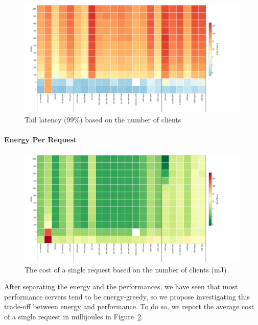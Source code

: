 \begin{figure}[!hbt]
    \begin{center}
        \includegraphics[width=1.2\linewidth]{imgs/tail99_clients}
    \end{center}
    \caption{Tail latency (99\%) based on the number of clients}\label{fig:tail99_clients}
\end{figure}



\paragraph{Energy Per Request}
\begin{figure}[!hbt]
    \begin{center}
        \includegraphics[width=1.2\linewidth]{imgs/energy_cost_clients}
    \end{center}
    \caption{The cost of a single request based on the number of clients (mJ)}\label{fig:energy_cost_clients}
\end{figure}
After separating the energy and the performances, we have seen that most performance servers tend to be energy-greedy, so we propose investigating this trade-off between energy and performance.
To do so, we report the average cost of a single request in millijoules in Figure~\ref{fig:energy_cost_clients}.

